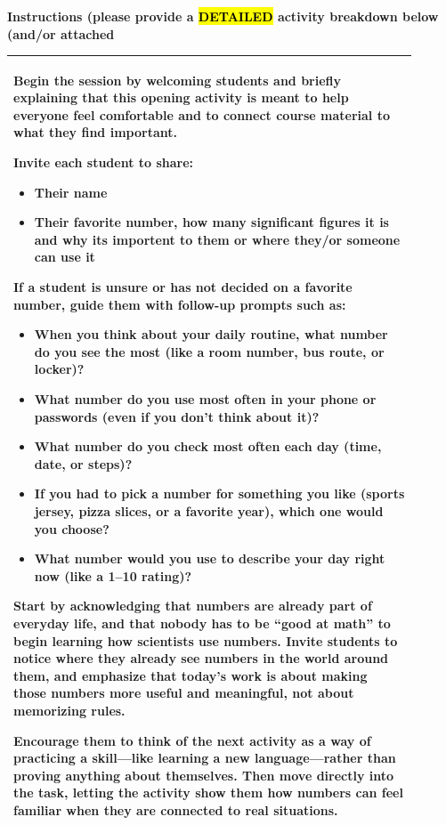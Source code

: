 \documentclass{article}
\begin{document}
\vspace{0.5cm}
\noindent
{\large \textbf{Instructions (please provide a \hl{DETAILED} activity breakdown below (and/or attached}} \\

\begin{tabular}{|p{0.9\linewidth}|}
\hline

\vspace{0.2cm}
Begin the session by welcoming students and briefly explaining that this opening activity is meant to help everyone feel comfortable and to connect course material to what they find important.

Invite each student to share:
\begin{itemize}
    \item Their name
    \item Their favorite number, how many significant figures it is and why its importent to them or where they/or someone can use it
\end{itemize}

If a student is unsure or has not decided on a favorite number, guide them with follow-up prompts such as:
\begin{itemize}
    \item When you think about your daily routine, what number do you see the most (like a room number, bus route, or locker)?
    \item What number do you use most often in your phone or passwords (even if you don’t think about it)?
    \item What number do you check most often each day (time, date, or steps)?
    \item If you had to pick a number for something you like (sports jersey, pizza slices, or a favorite year), which one would you choose?
    \item What number would you use to describe your day right now (like a 1–10 rating)?
\end{itemize}

Start by acknowledging that numbers are already part of everyday life, and that nobody has to be “good at math” to begin learning how scientists use numbers.
Invite students to notice where they already see numbers in the world around them, and emphasize that today’s work is about making those numbers more useful and meaningful, not about memorizing rules.

Encourage them to think of the next activity as a way of practicing a skill—like learning a new language—rather than proving anything about themselves. Then move directly into the task, letting the activity show them how numbers can feel familiar when they are connected to real situations. \\

\hline
\end{tabular}
\newpage
\end{document}
